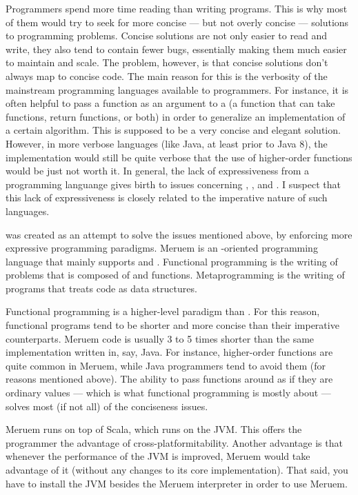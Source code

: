 Programmers spend more time reading than writing programs. This is why most of them would try to seek for more concise --- but not overly concise --- solutions to
programming problems. Concise solutions are not only easier to read and write, they also tend to contain fewer bugs, essentially making them much easier to
maintain and scale. The problem, however, is that concise solutions don't always map to concise code. The main reason for this is the
verbosity of the mainstream programming languages available to programmers. For instance, it is often helpful to pass a function as an argument to 
a  (a function that can take functions, return functions, or both) in order to generalize an implementation of a certain algorithm. This is supposed to be a very concise and elegant solution. 
However, in more verbose languages (like Java, at least prior to Java 8), the implementation would still be quite verbose that the use of higher-order functions
would be just not worth it. In general, the lack of expressiveness from a programming languange gives birth to issues concerning , 
, and . I suspect that this lack of expressiveness is closely related to the imperative nature of such languages.

 was created as an attempt to solve the issues mentioned above, by enforcing more expressive programming paradigms. Meruem is an -oriented
programming language that mainly supports  and . Functional programming is the writing of problems that is composed
of  and  functions. Metaprogramming is the writing of programs that treats code as data structures. 

Functional programming is a higher-level paradigm than . For this reason, functional programs tend to be shorter and more concise than their
imperative counterparts. Meruem code is usually 3 to 5 times shorter than the same implementation written in, say, Java. For instance, higher-order functions are quite common in 
Meruem, while Java programmers tend to avoid them (for reasons mentioned above). The ability to pass functions around as if they are ordinary values --- which is what functional
programming is mostly about --- solves most (if not all) of the conciseness issues.

Meruem runs on top of Scala, which runs on the JVM. This offers the programmer the advantage of cross-platformitability. Another advantage is that whenever the performance of the JVM is
improved, Meruem would take advantage of it (without any changes to its core implementation). That said, you have to install the JVM besides the Meruem interpreter in order to use Meruem.